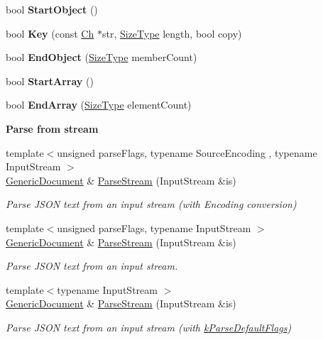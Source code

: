 \begin{DoxyCompactItemize}
bool {\bfseries Start\+Object} ()
\item 
\mbox{\label{a01996_a600d0950baabbcab11197cacb1459c7a}} 
bool {\bfseries Key} (const \hyperlink{a01992_ade0e0ce64ccd5d852da57a35e720bafb}{Ch} $\ast$str, \hyperlink{a00560_a5ed6e6e67250fadbd041127e6386dcb5}{Size\+Type} length, bool copy)
\item 
\mbox{\label{a01996_a42f2df68f9c9d8b88a15b609716867d9}} 
bool {\bfseries End\+Object} (\hyperlink{a00560_a5ed6e6e67250fadbd041127e6386dcb5}{Size\+Type} member\+Count)
\item 
\mbox{\label{a01996_ae12c513c61745ae731a47b1ca33db063}} 
bool {\bfseries Start\+Array} ()
\item 
\mbox{\label{a01996_a14097c833bed1a9c7be064ea619c887f}} 
bool {\bfseries End\+Array} (\hyperlink{a00560_a5ed6e6e67250fadbd041127e6386dcb5}{Size\+Type} element\+Count)
\end{DoxyCompactItemize}
\begin{Indent}\textbf{ Parse from stream}\par
\begin{DoxyCompactItemize}
\item 
{\footnotesize template$<$unsigned parse\+Flags, typename Source\+Encoding , typename Input\+Stream $>$ }\\\hyperlink{a01996}{Generic\+Document} \& \hyperlink{a01996_afe94c0abc83a20f2d7dc1ba7677e6238}{Parse\+Stream} (Input\+Stream \&is)
\begin{DoxyCompactList}\small\item\em Parse J\+S\+ON text from an input stream (with Encoding conversion) \end{DoxyCompactList}\item 
{\footnotesize template$<$unsigned parse\+Flags, typename Input\+Stream $>$ }\\\hyperlink{a01996}{Generic\+Document} \& \hyperlink{a01996_a6e154066c6f5024b91aaab25e03700e3}{Parse\+Stream} (Input\+Stream \&is)
\begin{DoxyCompactList}\small\item\em Parse J\+S\+ON text from an input stream. \end{DoxyCompactList}\item 
{\footnotesize template$<$typename Input\+Stream $>$ }\\\hyperlink{a01996}{Generic\+Document} \& \hyperlink{a01996_abe07ededbe9aaceb0058e3d254892b71}{Parse\+Stream} (Input\+Stream \&is)
\begin{DoxyCompactList}\small\item\em Parse J\+S\+ON text from an input stream (with \hyperlink{a00563_ab7be7dabe6ffcba60fad441505583450a9104b0946d648e9467cb7a967401ec80}{k\+Parse\+Default\+Flags}) \end{DoxyCompactList}\end{DoxyCompactItemize}
\end{Indent}
